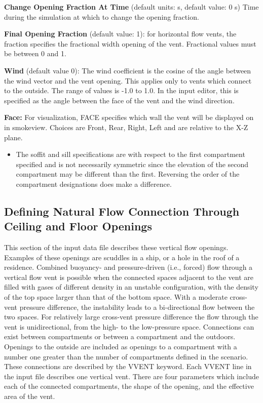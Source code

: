 \textbf{Change Opening Fraction At Time}  (default units: s, default value: 0 s)  Time during the simulation at which to change the opening fraction.

\textbf{Final Opening Fraction} (default value: 1): for horizontal flow vents, the fraction specifies the fractional width opening of the vent. Fractional values must be between 0 and 1.

\textbf{Wind} (default value 0): The wind coefficient is the cosine of the angle between the wind vector and the vent opening.  This applies only to vents which connect to the outside.  The range of values is -1.0 to 1.0.  In the input editor, this is specified as the angle between the face of the vent and the wind direction.

\textbf{Face:} For visualization, FACE specifies which wall the vent will be displayed on in smokeview.  Choices are Front, Rear, Right, Left and are relative to the X-Z plane.

\begin{itemize}
\item The soffit and sill specifications are with respect to the first compartment specified and is not necessarily symmetric since the elevation of the second compartment may be different than the first.  Reversing the order of the compartment designations does make a difference.
\end{itemize}

\subsection{Defining Natural Flow Connection Through Ceiling and Floor Openings}

This section of the input data file describes these vertical flow openings. Examples of these openings are scuddles in a ship, or a hole in the roof of a residence. Combined buoyancy- and pressure-driven (i.e., forced) flow through a vertical flow vent is possible when the connected spaces adjacent to the vent are filled with gases of different density in an unstable configuration, with the density of the top space larger than that of the bottom space. With a moderate cross-vent pressure difference, the instability leads to a bi-directional flow between the two spaces. For relatively large cross-vent pressure difference the flow through the vent is unidirectional, from the high- to the low-pressure space. 
Connections can exist between compartments or between a compartment and the outdoors. Openings to the outside are included as openings to a compartment with a number one greater than the number of compartments defined in the scenario.  These connections are described by the VVENT keyword. Each VVENT line in the input file describes one vertical vent.  There are four parameters which include each of the connected compartments, the shape of the opening, and the effective area of the vent.

